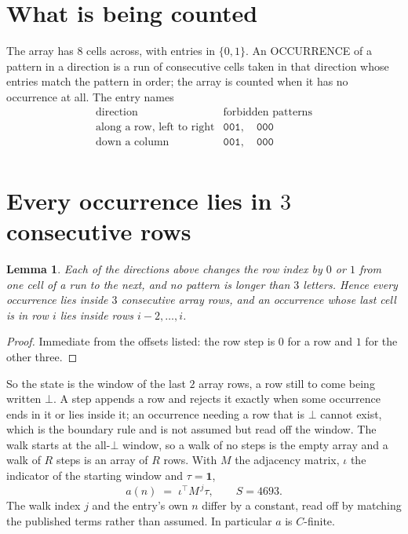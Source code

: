 \documentclass[11pt,a4paper]{article}
\theoremstyle{plain}
\newtheorem{lemma}[theorem]{Lemma}
\theoremstyle{definition}
\begin{document}
\section{What is being counted}

The array has $8$ cells across, with entries in $\{0,1\}$. An OCCURRENCE of a pattern in a
direction is a run of consecutive cells taken in that direction whose entries match the pattern
in order; the array is counted when it has no occurrence at all. The entry names
\[
\begin{array}{ll}
\text{direction} & \text{forbidden patterns} \\[2pt]
\text{along a row, left to right} & \mathtt{001},\quad \mathtt{000} \\
\text{down a column} & \mathtt{001},\quad \mathtt{000} \\
\end{array}
\]


\section{Every occurrence lies in $3$ consecutive rows}

\begin{lemma}\label{lem:win}
Each of the directions above changes the row index by $0$ or $1$ from one cell of a run to the
next, and no pattern is longer than $3$ letters. Hence every occurrence lies inside $3$
consecutive array rows, and an occurrence whose last cell is in row $i$ lies inside rows
$i-2,\dots,i$.
\end{lemma}

\begin{proof}
Immediate from the offsets listed: the row step is $0$ for a row and $1$ for the other three.
\end{proof}

So the state is the window of the last $2$ array rows, a row still to come being written
$\bot$. A step appends a row and rejects it exactly when some occurrence ends in it or lies
inside it; an occurrence needing a row that is $\bot$ cannot exist, which is the boundary rule
and is not assumed but read off the window. The walk starts at the all-$\bot$ window, so a walk
of no steps is the empty array and a walk of $R$ steps is an array of $R$ rows. With $M$ the
adjacency matrix, $\iota$ the indicator of the starting window and $\tau=\mathbf{1}$,
\[
a(n)\;=\;\iota^{\!\top}M^{\,j}\tau ,\qquad S=4693.
\]
The walk index $j$ and the entry's own $n$ differ by a constant, read off by matching the
published terms rather than assumed. In particular $a$ is $C$-finite.
\end{document}
